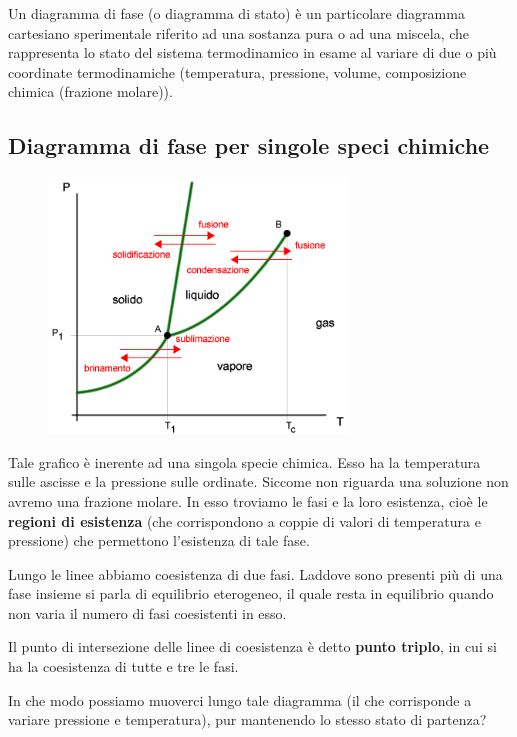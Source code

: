 Un diagramma di fase (o diagramma di stato) è un particolare diagramma cartesiano sperimentale riferito ad una sostanza pura o ad una miscela, che rappresenta lo stato del sistema termodinamico in esame al variare di due o più coordinate termodinamiche (temperatura, pressione, volume, composizione chimica (frazione molare)).

\subsection{Diagramma di fase per singole speci chimiche}

\begin{figure}[H]
    \centering
    \includegraphics[width=8cm]{immagini/diagramma_di_stato.png}
\end{figure}

Tale grafico è inerente ad una singola specie chimica. Esso ha la temperatura sulle ascisse e la pressione sulle ordinate. Siccome non riguarda una soluzione non avremo una frazione molare. In esso troviamo le fasi e la loro esistenza, cioè le \textbf{regioni di esistenza} (che corrispondono a coppie di valori di temperatura e pressione) che permettono l'esistenza di tale fase.

Lungo le linee abbiamo coesistenza di due fasi. Laddove sono presenti più di una fase insieme si parla di equilibrio eterogeneo, il quale resta in equilibrio quando non varia il numero di fasi coesistenti in esso.

Il punto di intersezione delle linee di coesistenza è detto \textbf{punto triplo}, in cui si ha la coesistenza di tutte e tre le fasi.

In che modo possiamo muoverci lungo tale diagramma (il che corrisponde a variare pressione e temperatura), pur mantenendo lo stesso stato di partenza?

